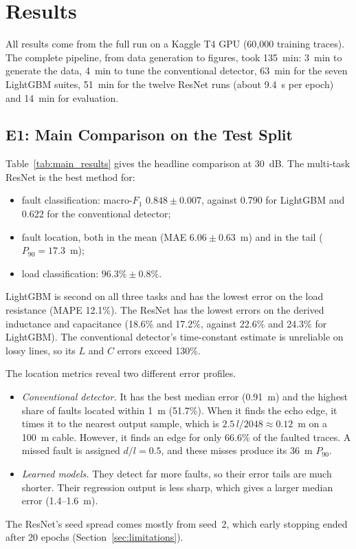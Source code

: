 \section{Results}
\label{sec:results}

All results come from the full run on a Kaggle T4 GPU (60,000 training traces). The complete pipeline, from data generation to figures, took 135~min: 3~min to generate the data, 4~min to tune the conventional detector, 63~min for the seven LightGBM suites, 51~min for the twelve ResNet runs (about 9.4~s per epoch) and 14~min for evaluation.

\subsection{E1: Main Comparison on the Test Split}
Table~\ref{tab:main_results} gives the headline comparison at 30~dB. The multi-task ResNet is the best method for:
\begin{itemize}
    \item fault classification: macro-$F_1$ $0.848 \pm 0.007$, against 0.790 for LightGBM and 0.622 for the conventional detector;
    \item fault location, both in the mean (MAE $6.06 \pm 0.63$~m) and in the tail ($P_{90} = 17.3$~m);
    \item load classification: $96.3\% \pm 0.8\%$.
\end{itemize}
LightGBM is second on all three tasks and has the lowest error on the load resistance (MAPE 12.1\%). The ResNet has the lowest errors on the derived inductance and capacitance (18.6\% and 17.2\%, against 22.6\% and 24.3\% for LightGBM). The conventional detector's time-constant estimate is unreliable on lossy lines, so its $L$ and $C$ errors exceed 130\%.

\begin{table}[!htbp]
\centering
\caption{Main comparison on the held-out test split (10,000 traces, 30~dB). LightGBM and ResNet1D: mean $\pm$ standard deviation over three training seeds. The conventional detector is deterministic.}
\label{tab:main_results}
\resizebox{\textwidth}{!}{%
%
}
\end{table}

The location metrics reveal two different error profiles.
\begin{itemize}
    \item \emph{Conventional detector.} It has the best median error (0.91~m) and the highest share of faults located within 1~m (51.7\%). When it finds the echo edge, it times it to the nearest output sample, which is $2.5\,l/2048 \approx 0.12$~m on a 100~m cable. However, it finds an edge for only 66.6\% of the faulted traces. A missed fault is assigned $d/l = 0.5$, and these misses produce its 36~m $P_{90}$.
    \item \emph{Learned models.} They detect far more faults, so their error tails are much shorter. Their regression output is less sharp, which gives a larger median error (1.4--1.6~m).
\end{itemize}
The ResNet's seed spread comes mostly from seed~2, which early stopping ended after 20 epochs (Section~\ref{sec:limitations}).

